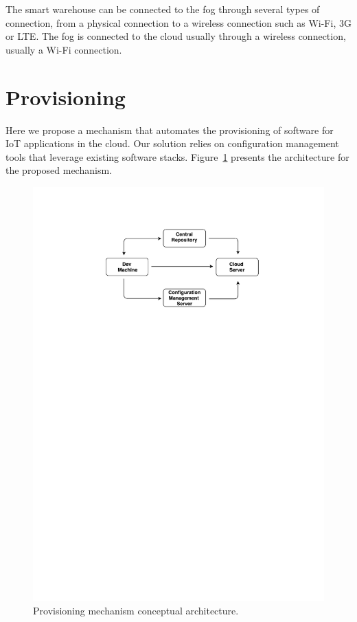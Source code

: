 The smart warehouse can be connected to the fog through several types of connection, from a physical
connection to a wireless connection such as Wi-Fi, 3G or \gls{LTE}. The fog is connected to the cloud
usually through a wireless connection, usually a Wi-Fi connection.

\section{Provisioning}
\label{sec:provisioning}
Here we propose a mechanism that automates the provisioning of software for \gls{IoT} applications
in the cloud. Our solution relies on configuration management tools that leverage existing software
stacks. Figure~\ref{fig:provisioning_generic_architecture} presents the architecture for the proposed
mechanism.\\

\begin{figure}[ht!]
  \centering
  \includegraphics[width=.7\textwidth]{images/c4t-generic-solution.pdf}
  \caption{Provisioning mechanism conceptual architecture.}
  \label{fig:provisioning_generic_architecture}
\end{figure}

